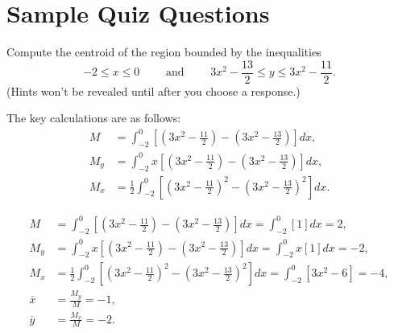 \documentclass{ximera}
\begin{document}
\section*{Sample Quiz Questions}
\begin{question}%

Compute the centroid of the region bounded by the inequalities \[-2 \leq x \leq 0 \qquad \text{ and } \qquad {3x^2-\frac{13}{2}} \leq y \leq {3x^2-\frac{11}{2}}.\]
(Hints won't be revealed until after you choose a response.)
\begin{multiplechoice}
\end{multiplechoice}
\begin{feedback}
The key calculations are as follows: 
\[ \begin{aligned}
M & = \int_{-2}^{0} \left[ \left({3x^2-\frac{11}{2}}\right) - \left({3x^2-\frac{13}{2}}\right) \right] dx , \\
M_y & = \int_{-2}^{0} x \left[ \left({3x^2-\frac{11}{2}}\right) - \left({3x^2-\frac{13}{2}}\right) \right] dx, \\
M_x & = \frac{1}{2} \int_{-2}^{0} \left[ \left({3x^2-\frac{11}{2}}\right)^2 - \left({3x^2-\frac{13}{2}}\right)^2 \right] dx.
\end{aligned}\]
 \begin{hint}
 \[ \begin{aligned}
M & = \int_{-2}^{0} \left[ \left({3x^2-\frac{11}{2}}\right) - \left({3x^2-\frac{13}{2}}\right) \right] dx = \int_{-2}^{0} \left[{1}\right] dx = 2, \\
M_y & = \int_{-2}^{0} x \left[ \left({3x^2-\frac{11}{2}}\right) - \left({3x^2-\frac{13}{2}}\right) \right] dx = \int_{-2}^{0} x \left[{1}\right] dx = -2, \\
M_x & = \frac{1}{2} \int_{-2}^{0} \left[ \left({3x^2-\frac{11}{2}}\right)^2 - \left({3x^2-\frac{13}{2}}\right)^2 \right] dx = \int_{-2}^{0} \left[{3x^2-6}\right] = -4, \\
 \overline{x} &  = \frac{M_y}{M} = -1, \\
 \overline{y} &  = \frac{M_x}{M} = -2.\end{aligned}\]
 \end{hint}
\end{feedback}

\end{question}
\end{document}
